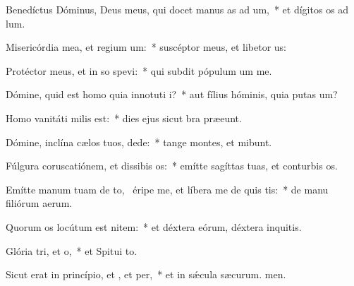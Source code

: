 \item Benedíctus Dóminus, Deus meus, qui docet manus as ad um,~* et dígitos os ad lum.
\item Misericórdia mea, et regium um:~* suscéptor meus, et libetor us:
\item Protéctor meus, et in so spevi:~* qui subdit pópulum um  me.
\item Dómine, quid est homo quia innotuti i?~* aut fílius hóminis, quia putas um?
\item Homo vanitáti milis  est:~* dies ejus sicut bra præeunt.
\item Dómine, inclína cælos tuos,  dede:~* tange montes, et mibunt.
\item Fúlgura coruscatiónem, et dissibis os:~* emítte sagíttas tuas, et conturbis os.
\item Emítte manum tuam de to,~\pscross{} éripe me, et líbera me de quis tis:~* de manu filiórum aerum.
\item Quorum os locútum est nitem:~* et déxtera eórum, déxtera inquitis.
\item Glória tri, et o,~* et Spitui to.
\item Sicut erat in princípio, et , et per,~* et in sǽcula sæcurum. men.
